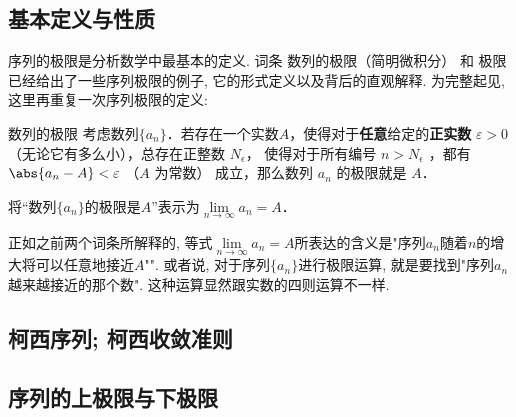

\subsection{基本定义与性质}

序列的极限是分析数学中最基本的定义. 词条 数列的极限（简明微积分） 和 极限 已经给出了一些序列极限的例子, 它的形式定义以及背后的直观解释. 为完整起见, 这里再重复一次序列极限的定义:

\begin{definition}{数列的极限}
考虑数列$\{a_n\}$．若存在一个实数$A$，使得对于\textbf{任意}给定的\textbf{正实数} $\varepsilon > 0$（无论它有多么小），总存在正整数 $N_\epsilon$， 使得对于所有编号 $n>N_\epsilon$ ，都有 $\abs{a_n - A} < \varepsilon$ （$A$ 为常数） 成立，那么数列 $a_n$ 的极限就是 $A$．

将“数列$\{a_n\}$的极限是$A$”表示为$\lim\limits_{n\to\infty}a_n=A$．
\end{definition}

正如之前两个词条所解释的, 等式$\lim\limits_{n\to\infty}a_n=A$所表达的含义是"序列$a_n$随着$n$的增大将可以任意地接近$A$"". 或者说, 对于序列$\{a_n\}$进行极限运算, 就是要找到"序列$a_n$越来越接近的那个数". 这种运算显然跟实数的四则运算不一样.

\subsection{柯西序列; 柯西收敛准则}

\subsection{序列的上极限与下极限}
